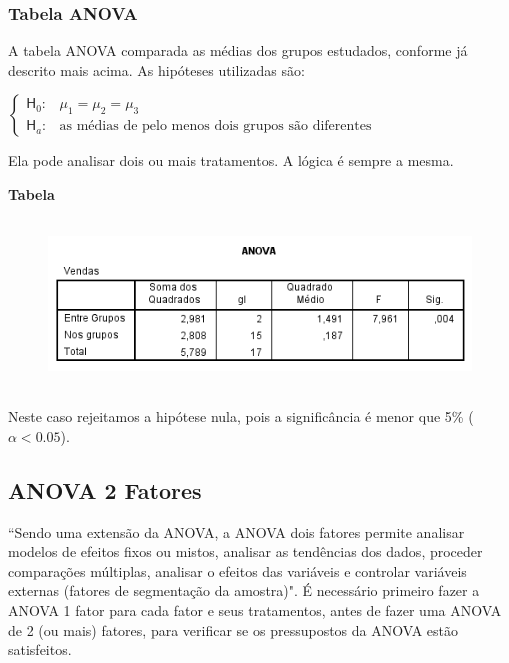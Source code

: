 		\subsubsection{Tabela ANOVA}

			A tabela ANOVA comparada as médias dos grupos estudados, conforme já descrito mais acima. As hipóteses utilizadas são:

			\bigskip

			$
			\begin{cases}
				\mathsf{H}_{0} : & \mu_{1} = \mu_{2} = \mu_{3} \\
				\mathsf{H}_{a} : & \text{as médias de pelo menos dois grupos são diferentes}
			\end{cases}
			$
			
			\bigskip

			Ela pode analisar dois ou mais tratamentos. A lógica é sempre a mesma.

			\bigskip
			
			\textbf{Tabela}
			
			\begin{figure}[H]
				\centering
				\includegraphics[height=4.5cm]{images/anova_tabela}
			\end{figure}						
			
			Neste caso rejeitamos a hipótese nula, pois a significância é menor que 5\% ($ \alpha < 0.05$).

	\subsection{ANOVA 2 Fatores \cite{torres}}

		``Sendo uma extensão da ANOVA, a ANOVA dois fatores permite analisar modelos de efeitos fixos ou mistos, analisar as tendências dos dados, proceder comparações múltiplas, analisar o efeitos das variáveis e controlar variáveis externas (fatores de segmentação da amostra)".
		É necessário primeiro fazer a ANOVA 1 fator para cada fator e seus tratamentos, antes de fazer uma ANOVA de 2 (ou mais) fatores, para verificar se os pressupostos da ANOVA estão satisfeitos.

